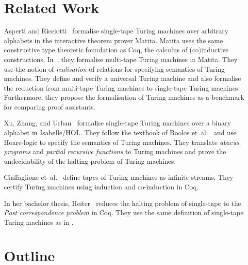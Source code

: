 \section{Related Work}
\label{sec:relatedwork}

Asperti and Ricciotti~\cite{asperti2012} formalise single-tape Turing machines over arbitrary alphabets in the interactive theorem prover Matita.
Matita uses the same constructive type theoretic foundation as Coq, the calculus of (co)inductive constructions.  In~\cite{asperti2015}, they
formalise multi-tape Turing machines in Matita.  They use the notion of \textit{realisation} of relations for specifying semantics of Turing machines.
They define and verify a universal Turing machine and also formalise the reduction from multi-tape Turing machines to single-tape Turing machines.
Furthermore, they propose the formalisation of Turing machines as a benchmark for comparing proof assistants.

Xu, Zhang, and Urban~\cite{Xu:2013:MTM:2529315.2529331} formalise single-tape Turing machines over a binary alphabet in Isabelle/HOL.  They follow the
textbook of Boolos et~al.~\cite{boolos2007computability} and use Hoare-logic to specify the semantics of Turing machines.  They translate
\textit{abacus programs} and \textit{partial recursive functions} to Turing machines and prove the undecidability of the halting problem of Turing
machines.

Ciaffaglione et~al.~\cite{Ciaffaglione:2016:TTC:2956213.2956306} define tapes of Turing machines as infinite streams.  They certify Turing machines
using induction and co-induction in Coq.

In her bachelor thesis, Heiter~\cite{Heiter} reduces the halting problem of single-tape to the \textit{Post correspondence problem} in Coq.  They use
the same definition of single-tape Turing machines as in \cite{asperti2012}.



\section{Outline}
\label{sec:outline}

